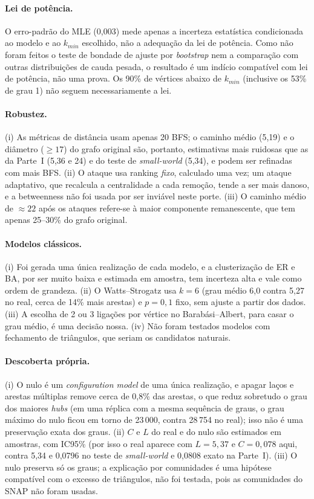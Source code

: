 \documentclass[sigconf]{webmedia}
\begin{document}
\paragraph{Lei de potência.} O erro-padrão do MLE (0,003) mede apenas a incerteza estatística condicionada ao modelo e ao $k_{min}$ escolhido, não a adequação da lei de potência. Como não foram feitos o teste de bondade de ajuste por \emph{bootstrap} nem a comparação com outras distribuições de cauda pesada, o resultado é um indício compatível com lei de potência, não uma prova. Os 90\% de vértices abaixo de $k_{min}$ (inclusive os 53\% de grau 1) não seguem necessariamente a lei.

\paragraph{Robustez.} (i) As métricas de distância usam apenas 20 BFS; o caminho médio (5,19) e o diâmetro ($\ge17$) do grafo original são, portanto, estimativas mais ruidosas que as da Parte~I (5,36 e 24) e do teste de \emph{small-world} (5,34), e podem ser refinadas com mais BFS. (ii) O ataque usa ranking \emph{fixo}, calculado uma vez; um ataque adaptativo, que recalcula a centralidade a cada remoção, tende a ser mais danoso, e a betweenness não foi usada por ser inviável neste porte. (iii) O caminho médio de $\approx22$ após os ataques refere-se à maior componente remanescente, que tem apenas 25--30\% do grafo original.

\paragraph{Modelos clássicos.} (i) Foi gerada uma única realização de cada modelo, e a clusterização de ER e BA, por ser muito baixa e estimada em amostra, tem incerteza alta e vale como ordem de grandeza. (ii) O Watts--Strogatz usa $k=6$ (grau médio 6,0 contra 5,27 no real, cerca de 14\% mais arestas) e $p=0{,}1$ fixo, sem ajuste a partir dos dados. (iii) A escolha de 2 ou 3 ligações por vértice no Barabási--Albert, para casar o grau médio, é uma decisão nossa. (iv) Não foram testados modelos com fechamento de triângulos, que seriam os candidatos naturais.

\paragraph{Descoberta própria.} (i) O nulo é um \emph{configuration model} de uma única realização, e apagar laços e arestas múltiplas remove cerca de 0,8\% das arestas, o que reduz sobretudo o grau dos maiores \emph{hubs} (em uma réplica com a mesma sequência de graus, o grau máximo do nulo ficou em torno de 23\,000, contra 28\,754 no real); isso não é uma preservação exata dos graus. (ii) $C$ e $L$ do real e do nulo são estimados em amostras, com IC95\% (por isso o real aparece com $L=5{,}37$ e $C=0{,}078$ aqui, contra 5,34 e 0,0796 no teste de \emph{small-world} e 0,0808 exato na Parte~I). (iii) O nulo preserva só os graus; a explicação por comunidades é uma hipótese compatível com o excesso de triângulos, não foi testada, pois as comunidades do SNAP não foram usadas.
\end{document}

